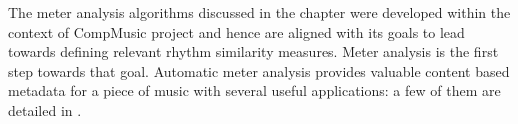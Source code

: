 The meter analysis algorithms discussed in the chapter were developed within the context of CompMusic project and hence are aligned with its goals to lead towards defining relevant rhythm similarity measures. Meter analysis is the first step towards that goal. Automatic meter analysis provides valuable content based metadata for a piece of music with several useful applications: a few of them are detailed in . 
% 
% 
%
% 
%
